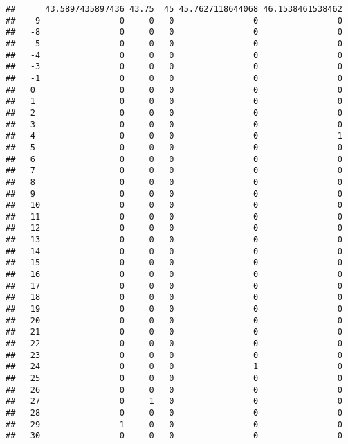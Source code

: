 \documentclass[]{article}
\begin{document}
\begin{verbatim}
##      43.5897435897436 43.75  45 45.7627118644068 46.1538461538462
##   -9                0     0   0                0                0
##   -8                0     0   0                0                0
##   -5                0     0   0                0                0
##   -4                0     0   0                0                0
##   -3                0     0   0                0                0
##   -1                0     0   0                0                0
##   0                 0     0   0                0                0
##   1                 0     0   0                0                0
##   2                 0     0   0                0                0
##   3                 0     0   0                0                0
##   4                 0     0   0                0                1
##   5                 0     0   0                0                0
##   6                 0     0   0                0                0
##   7                 0     0   0                0                0
##   8                 0     0   0                0                0
##   9                 0     0   0                0                0
##   10                0     0   0                0                0
##   11                0     0   0                0                0
##   12                0     0   0                0                0
##   13                0     0   0                0                0
##   14                0     0   0                0                0
##   15                0     0   0                0                0
##   16                0     0   0                0                0
##   17                0     0   0                0                0
##   18                0     0   0                0                0
##   19                0     0   0                0                0
##   20                0     0   0                0                0
##   21                0     0   0                0                0
##   22                0     0   0                0                0
##   23                0     0   0                0                0
##   24                0     0   0                1                0
##   25                0     0   0                0                0
##   26                0     0   0                0                0
##   27                0     1   0                0                0
##   28                0     0   0                0                0
##   29                1     0   0                0                0
##   30                0     0   0                0                0

\end{verbatim}
\end{document}
